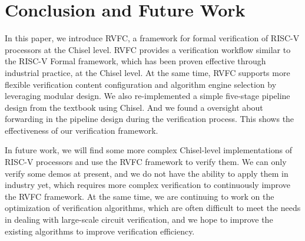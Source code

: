 \documentclass[conference]{IEEEtran}
\theoremstyle{definition}
\begin{document}
\section{Conclusion and Future Work}
In this paper, we introduce RVFC, a framework for formal verification of RISC-V processors at the Chisel level.
RVFC provides a verification workflow similar to the RISC-V Formal framework, which has been proven effective through industrial practice, at the Chisel level.
At the same time, RVFC supports more flexible verification content configuration and algorithm engine selection by leveraging modular design.
We also re-implemented a simple five-stage pipeline design from the textbook using Chisel.
And we found a oversight about forwarding in the pipeline design during the verification process.
This shows the effectiveness of our verification framework.

In future work, we will find some more complex Chisel-level implementations of RISC-V processors and use the RVFC framework to verify them.
We can only verify some demos at present, and we do not have the ability to apply them in industry yet, which requires more complex verification to continuously improve the RVFC framework.
At the same time, we are continuing to work on the optimization of verification algorithms, which are often difficult to meet the needs in dealing with large-scale circuit verification, and we hope to improve the existing algorithms to improve verification efficiency.



\end{document}
